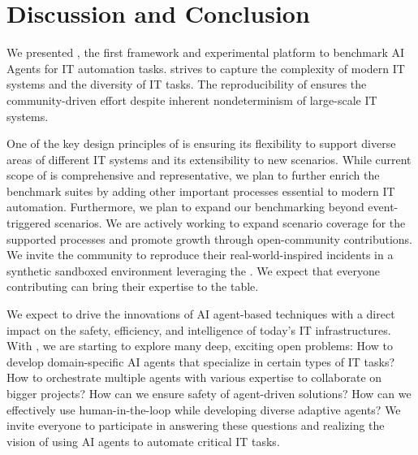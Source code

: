 \section{Discussion and Conclusion}
\label{sec:discuss}

We presented \bench, the first framework  and experimental platform to benchmark AI Agents for IT automation tasks. \bench strives to capture the complexity of modern IT systems and the diversity of IT tasks. The reproducibility of \bench ensures the community-driven effort despite inherent nondeterminism of large-scale IT systems. 

One of the key design principles of \bench is ensuring its flexibility to support diverse areas of different IT systems
and its extensibility to new scenarios. While current scope of \bench is comprehensive and representative, we plan to further enrich the benchmark suites by adding other important processes essential to modern IT automation. Furthermore, we plan to expand our benchmarking beyond event-triggered scenarios. 
We are actively working to expand scenario coverage for the supported processes and promote growth through open-community contributions.
 We invite the community to reproduce their real-world-inspired incidents in a synthetic sandboxed environment leveraging the \bench. We expect that everyone contributing can bring their expertise to the table.

We expect \bench to drive the innovations of AI agent-based techniques with a direct impact on the safety, efficiency, and intelligence of today’s IT infrastructures. 
With \bench, we are starting to explore many deep, exciting open problems: How to develop domain-specific AI agents that specialize in certain types of IT tasks? How to orchestrate multiple agents with various expertise to collaborate on bigger projects? How can we ensure safety of agent-driven solutions? How can we effectively use human-in-the-loop while developing diverse adaptive agents? We invite everyone to participate in answering these questions and realizing the vision of using AI agents to automate critical IT tasks.

